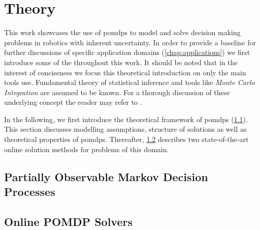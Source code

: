 \chapter{Theory}

This work showcases the use of \glspl{pomdp} to model and solve decision making
problems in robotics with inherent uncertainty. In order to provide a baseline
for further discussions of specific application domains
(\cref{chap:applications}) we first introduce some of the throughout this work.
It should be noted that in the interest of conciseness we focus this
theoretical introduction on only the main tools use. Fundamental theory of
statistical inference and tools like \textit{Monte Carlo Integration} are
assumed to be known. For a thorough discussion of these underlying concept the
reader may refer to \cite{kochenderfer2015decision}.

In the following, we first introduce the theoretical framework of \glspl{pomdp}
(\cref{sec:pomdp}). This section discusses modelling assumptions, structure
of solutions as well as theoretical properties of \glspl{pomdp}. Thereafter,
\cref{sec:online-pomdp-solvers} describes two state-of-the-art online solution
methods for problems of this domain.

\section{Partially Observable Markov Decision Processes}\label{sec:pomdp}





\section{Online POMDP Solvers}\label{sec:online-pomdp-solvers}



